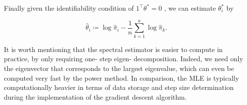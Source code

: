 Finally given the identifiability condition of
\(1^{\top}\theta^{*} = 0\) , we can estimate \(\theta_{i}^{*}\) by

\[
\widehat{\theta}_{i}\coloneqq \log \widehat{\pi}_{i} - \frac{1}{n}\sum_{k = 1}^{n}\log \widehat{\pi}_{k}. \tag{2.1}
\]

It is worth mentioning that the spectral estimator is easier to compute
in practice, by only requiring one- step eigen- decomposition. Indeed,
we need only the eigenvector that corresponds to the largest eigenvalue,
which can even be computed very fast by the power method. In comparison,
the MLE is typically computationally heavier in terms of data storage
and step size determination during the implementation of the gradient
descent algorithm.


